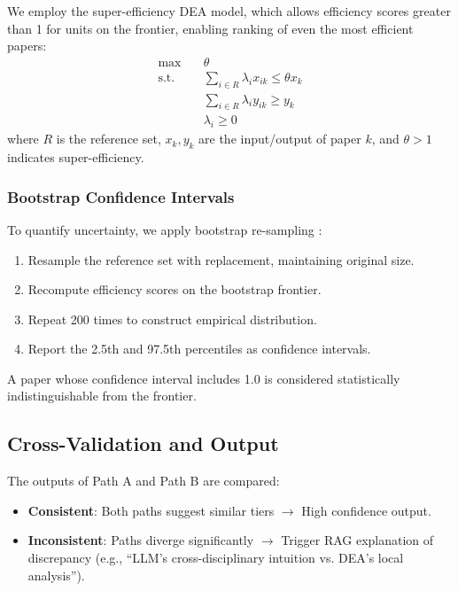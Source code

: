 \documentclass[11pt,a4paper]{article}
\newcommand{\dea}{DEA}
\begin{document}
We employ the super-efficiency \dea{} model, which allows efficiency scores greater than 1 for units on the frontier, enabling ranking of even the most efficient papers:
\begin{align}
\max \quad & \theta \\
\text{s.t.} \quad & \sum_{i \in R} \lambda_i x_{ik} \leq \theta x_{k} \\
& \sum_{i \in R} \lambda_i y_{ik} \geq y_{k} \\
& \lambda_i \geq 0
\end{align}
where $R$ is the reference set, $x_k, y_k$ are the input/output of paper $k$, and $\theta > 1$ indicates super-efficiency.

\subsubsection{Bootstrap Confidence Intervals}

To quantify uncertainty, we apply bootstrap re-sampling \citep{efron1994introduction}:

\begin{enumerate}
    \item Resample the reference set with replacement, maintaining original size.
    \item Recompute efficiency scores on the bootstrap frontier.
    \item Repeat 200 times to construct empirical distribution.
    \item Report the 2.5th and 97.5th percentiles as confidence intervals.
\end{enumerate}

A paper whose confidence interval includes 1.0 is considered statistically indistinguishable from the frontier.

\subsection{Cross-Validation and Output}

The outputs of Path A and Path B are compared:

\begin{itemize}
    \item \textbf{Consistent}: Both paths suggest similar tiers $\rightarrow$ High confidence output.
    \item \textbf{Inconsistent}: Paths diverge significantly $\rightarrow$ Trigger RAG explanation of discrepancy (e.g., ``LLM's cross-disciplinary intuition vs. DEA's local analysis'').
\end{itemize}
\end{document}
